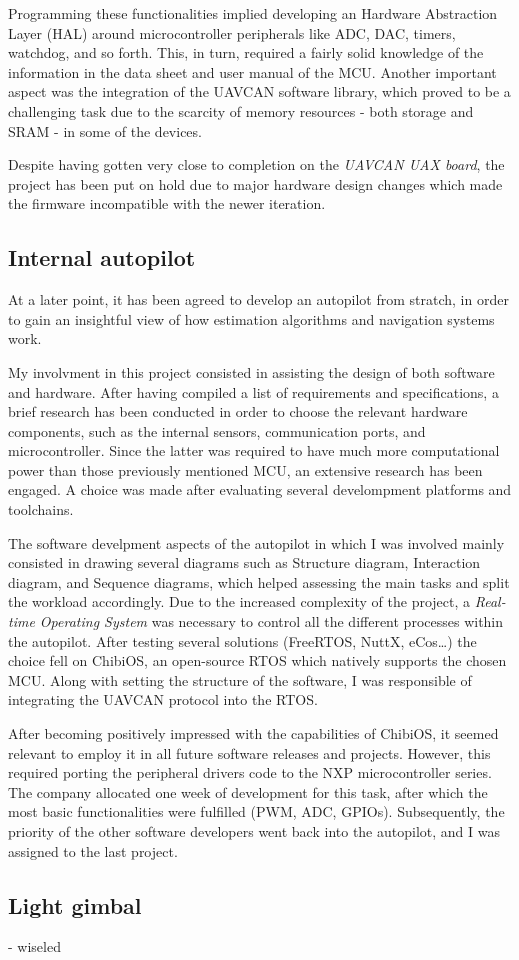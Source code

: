 Programming these functionalities implied developing an Hardware Abstraction Layer (HAL) around microcontroller peripherals like ADC, DAC, timers, watchdog, and so forth.
This, in turn, required a fairly solid knowledge of the information in the data sheet and user manual of the MCU.
Another important aspect was the integration of the UAVCAN software library, which proved to be a challenging task due to the scarcity of memory resources - both storage and SRAM - in some of the devices.

Despite having gotten very close to completion on the \emph{UAVCAN UAX board}, the project has been put on hold due to major hardware design changes which made the firmware incompatible with the newer iteration.


\subsection{Internal autopilot}
At a later point, it has been agreed to develop an autopilot from stratch, in order to gain an insightful view of how estimation algorithms and navigation systems work.

My involvment in this project consisted in assisting the design of both software and hardware.
After having compiled a list of requirements and specifications, a brief research has been conducted in order to choose the relevant hardware components, such as the internal sensors, communication ports, and microcontroller.
Since the latter was required to have much more computational power than those previously mentioned MCU, an extensive research has been engaged.
A choice was made after evaluating several develompment platforms and toolchains.

The software develpment aspects of the autopilot in which I was involved mainly consisted in drawing several diagrams such as Structure diagram, Interaction diagram, and Sequence diagrams, which helped assessing the main tasks and split the workload accordingly.
Due to the increased complexity of the project, a \emph{Real-time Operating System} was necessary to control all the different processes within the autopilot. 
After testing several solutions (FreeRTOS, NuttX, eCos\dots) the choice fell on ChibiOS, an open-source RTOS which natively supports the chosen MCU.
Along with setting the structure of the software, I was responsible of integrating the UAVCAN protocol into the RTOS.

After becoming positively impressed with the capabilities of ChibiOS, it seemed relevant to employ it in all future software releases and projects. 
However, this required porting the peripheral drivers code to the NXP microcontroller series.
The company allocated one week of development for this task, after which the most basic functionalities were fulfilled (PWM, ADC, GPIOs).
Subsequently, the priority of the other software developers went back into the autopilot, and I was assigned to the last project.


\subsection{Light gimbal}




- wiseled
